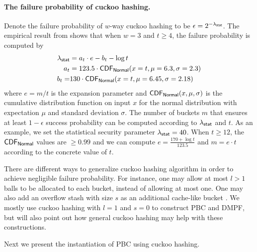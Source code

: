 \paragraph{The failure probability of cuckoo hashing.}Denote the failure probability of $w$-way cuckoo hashing to be $\epsilon=2^{-\lambda_{{\sf stat}}}$. The empirical result from \cite[Appendix B]{cryptoeprint:2018/579} shows that when $w=3$ and $t\ge 4$, the failure probability is computed by 
\[\begin{split}
  \lambda_{\sf stat} &= a_t\cdot e - b_t-\log t\\
  a_t &= 123.5\cdot {\sf CDF_{Normal}}(x=t, \mu = 6.3, \sigma = 2.3)\\
  b_t =& 130\cdot {\sf CDF_{Normal}}(x=t, \mu = 6.45, \sigma = 2.18)
\end{split}
\] where $e = m/t$ is the expansion parameter and ${\sf CDF_{Normal}}(x,\mu,\sigma)$ is the cumulative distribution function on input $x$ for the normal distribution with expectation $\mu$ and standard deviation $\sigma$. The number of buckets $m$ that ensures at least $1-\epsilon$ success probability can be computed according to $\lambda_{\sf stat}$ and $t$. As an example, we set the statistical security parameter $\lambda_{{\sf stat}}=40$. When $t\ge 12$, the $\sf CDF_{Normal}$ values are $\ge 0.99$ and we can compute $e = \frac{170+\log t}{123.5}$ and $m = e\cdot t$ according to the concrete value of $t$. 

\begin{remark}
    There are different ways to generalize cuckoo hashing algorithm in order to achieve negligible failure probability. For instance, one may allow at most $l>1$ balls to be allocated to each bucket, instead of allowing at most one. One may also add an overflow stash with size $s$ as an additional cache-like bucket \cite{KMW10}. We mostly use cuckoo hashing with $l=1$ and $s=0$ to construct PBC and DMPF, but will also point out how general cuckoo hashing may help with these constructions.
\end{remark}

Next we present the instantiation of PBC using cuckoo hashing. 


